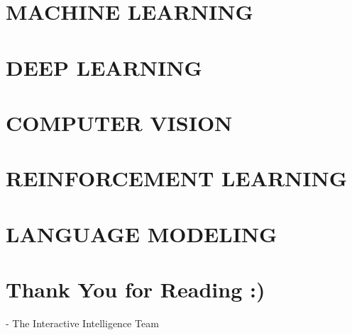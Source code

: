 \documentclass{article}
\begin{document}
\newpage
\tableofcontents
\newpage

\section*{MACHINE LEARNING}


\section*{DEEP LEARNING}


\section*{COMPUTER VISION}


\section*{REINFORCEMENT LEARNING}


\section*{LANGUAGE MODELING}

\newpage

\centering
\begingroup
\section*{Thank You for Reading :)}
- The Interactive Intelligence Team
\endgroup
\end{document}

